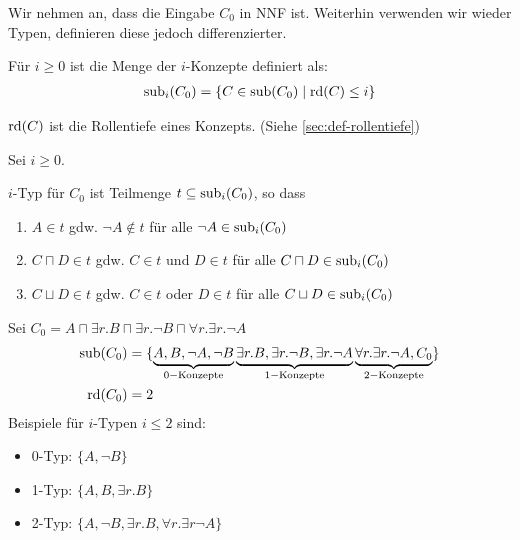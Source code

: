 Wir nehmen an, dass die Eingabe $C_0$ in NNF ist. Weiterhin verwenden wir wieder Typen, definieren diese jedoch differenzierter.

\begin{definition}[$i$-Konzepte]

Für $i \geq 0$ ist die Menge der $i$-Konzepte definiert als:
\begin{align*}
\sub_{i} \left( C_0 \right) = \left\{ C \in \sub\left( C_0 \right) \mid \rd\left( C \right) \leq i \right\}
\end{align*}
\end{definition}
$\operatorname{rd}(C)$ ist die Rollentiefe eines Konzepts.
(Siehe \autoref{sec:def-rollentiefe})

\begin{definition}[$i$-Typ]
Sei $i \geq 0$.

$i$-Typ für $C_{0}$ ist Teilmenge
$t \subseteq \sub_{i}\left( C_{0} \right)$, so dass

\begin{enumerate}
\item
  $A \in t$ gdw. $\neg A \notin t$ für alle
  $\neg A \in \sub_{i}\left( C_{0} \right)$
\item
  $C \sqcap D \in t$ gdw. $C \in t$ und $D \in t$ für alle
  $C \sqcap D \in \sub_{i}\left( C_{0} \right)$
\item
  $C \sqcup D \in t$ gdw. $C \in t$ oder $D \in t$ für alle
  $C \sqcup D \in \sub_{i}\left( C_{0} \right)$
\end{enumerate}
\end{definition}

\begin{tafel}\label{t:example58}
    Sei $C_0 = A \sqcap \exists r.B \sqcap \exists r. \neg B \sqcap \forall r.\exists r.\neg A$
    \begin{align*}
        \operatorname{sub}(C_0) &=
        \{ \underbrace{A, B, \neg A, \neg B}_{0-\text{Konzepte}}
            \underbrace{\exists r.B, \exists r.\neg B, \exists r.\neg A}_{1-\text{Konzepte}}
            \underbrace{\forall r.\exists r.\neg A, C_0}_{2-\text{Konzepte}}
        \}\\
        \operatorname{rd}(C_0)& = 2
    \end{align*}
    Beispiele für $i$-Typen $i \leq 2$ sind:
    \begin{itemize}
        \item 0-Typ: $\{A, \neg B\}$
        \item 1-Typ: $\{A,  B, \exists r.B\}$
        \item 2-Typ: $\{A,  \neg B, \exists r.B, \forall r. \exists r \neg A\}$
    \end{itemize}
\end{tafel}

